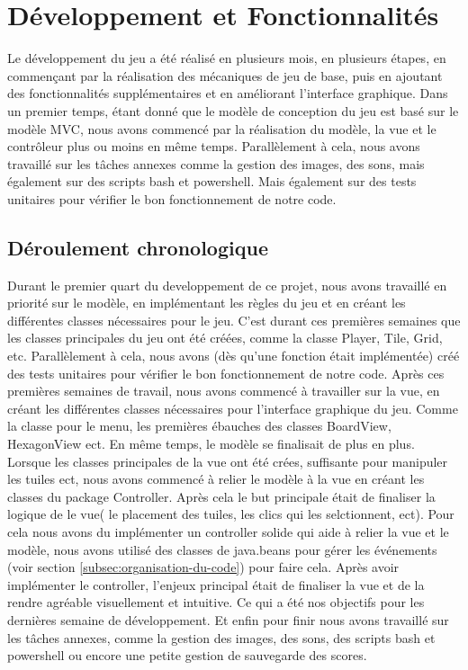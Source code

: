 \documentclass{article}
\begin{document}
    \section{Développement et Fonctionnalités}\label{sec:developpement-et-fonctionnalites}

    Le développement du jeu a été réalisé en plusieurs mois, en plusieurs étapes, en commençant par la réalisation des mécaniques de jeu de base, puis en ajoutant des fonctionnalités supplémentaires et en améliorant l'interface graphique.
    Dans un premier temps, étant donné que le modèle de conception du jeu est basé sur le modèle MVC, nous avons commencé par la réalisation du modèle, la vue et le contrôleur plus ou moins en même temps.
    Parallèlement à cela, nous avons travaillé sur les tâches annexes comme la gestion des images, des sons, mais également sur des scripts bash et powershell.
    Mais également sur des tests unitaires pour vérifier le bon fonctionnement de notre code.

    \subsection{Déroulement chronologique}\label{subsec:deroulement-chronologique}

    Durant le premier quart du developpement de ce projet, nous avons travaillé en priorité sur le modèle, en implémentant les règles du jeu et en créant les différentes classes nécessaires pour le jeu.
    C'est durant ces premières semaines que les classes principales du jeu ont été créées, comme la classe Player, Tile, Grid, etc.
    Parallèlement à cela, nous avons (dès qu'une fonction était implémentée) créé des tests unitaires pour vérifier le bon fonctionnement de notre code.
    Après ces premières semaines de travail, nous avons commencé à travailler sur la vue, en créant les différentes classes nécessaires pour l'interface graphique du jeu.
    Comme la classe pour le menu, les premières ébauches des classes BoardView, HexagonView ect.
    En même temps, le modèle se finalisait de plus en plus.
    Lorsque les classes principales de la vue ont été crées, suffisante pour manipuler les tuiles ect, nous avons commencé à relier le modèle à la vue en créant les classes du package Controller.
    Après cela le but principale était de finaliser la logique de le vue( le placement des tuiles, les clics qui les selctionnent, ect).
    Pour cela nous avons du implémenter un controller solide qui aide à relier la vue et le modèle, nous avons utilisé des classes de java.beans pour gérer les événements (voir section \ref{subsec:organisation-du-code}) pour faire cela.
    Après avoir implémenter le controller, l'enjeux principal était de finaliser la vue et de la rendre agréable visuellement et intuitive.
    Ce qui a été nos objectifs pour les dernières semaine de développement.
    Et enfin pour finir nous avons travaillé sur les tâches annexes, comme la gestion des images, des sons, des scripts bash et powershell ou encore une petite gestion de sauvegarde des scores.
\end{document}
